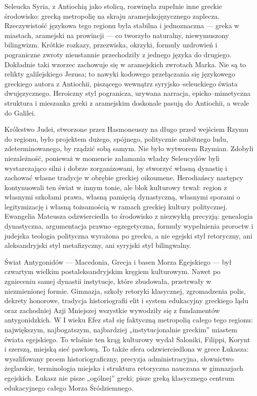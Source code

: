 Seleucka Syria, z Antiochią jako stolicą, rozwinęła zupełnie inne greckie środowisko: grecką metropolię na skraju aramejskojęzycznego zaplecza.
Rzeczywistość językowa tego regionu była stabilna i jednoznaczna — greka w miastach, aramejski na prowincji — co tworzyło naturalny, niewymuszony bilingwizm.
Krótkie rozkazy, przezwiska, okrzyki, formuły uzdrowień i pograniczne zwroty nieustannie przechodziły z jednego języka do drugiego.
Dokładnie taki wzorzec zachowuje się w aramejskich zwrotach Marka.
Nie są to relikty galilejskiego Jezusa; to nawyki kodowego przełączania się językowego greckiego autora z Antiochii, piszącego wewnątrz syryjsko–seleuckiego świata dwujęzycznego.
Heroiczny styl pogranicza, urywana narracja, epicko–mimetyczna struktura i mieszanka greki z aramejskim doskonale pasują do Antiochii, a wcale do Galilei.

Królestwo Judei, stworzone przez Hasmoneuszy na długo przed wejściem Rzymu do regionu, było projektem dużego, spójnego, politycznie ambitnego ludu, zdeterminowanego, by rządzić sobą samym.
Nie było wytworem Rzymian.
Zdobyli niezależność, ponieważ w momencie załamania władzy Seleucydów byli wystarczająco silni i dobrze zorganizowani, by stworzyć własną dynastię i zachować własne tradycje w obrębie greckiej oikoumene.
Herodiańscy następcy kontynuowali ten świat w innym tonie, ale blok kulturowy trwał: region z własnymi szkołami prawa, własną pamięcią dynastyczną, własnymi sporami o legitymizację i własną tożsamością w ramach greckiej kultury politycznej.
Ewangelia Mateusza odzwierciedla to środowisko z niezwykłą precyzją: genealogia dynastyczna, argumentacja prawno–egzegetyczna, formuły wypełnienia proroctw i judejska teologia polityczna wyrażona po grecku, a nie egejski styl retoryczny, ani aleksandryjski styl metafizyczny, ani syryjski styl bilingwalny.

Świat Antygonidów — Macedonia, Grecja i basen Morza Egejskiego — był czwartym wielkim postaleksandryjskim kręgiem kulturowym.
Nawet po zgnieceniu samej dynastii instytucje, które zbudowała, przetrwały w niezmienionej formie.
Gimnazja, szkoły retoryki klasycznej, zgromadzenia polis, dekrety honorowe, tradycja historiografii elit i system edukacyjny greckiego lądu oraz zachodniej Azji Mniejszej wszystkie wywodziły się z fundamentów antygonidzkich.
W I wieku Efez stał się faktyczną metropolią całego tego regionu: największym, najbogatszym, najbardziej „instytucjonalnie greckim” miastem świata egejskiego.
To właśnie ten krąg kulturowy wydał Saloniki, Filippi, Korynt i szerszą, miejską sieć pawłową.
To także sfera odzwierciedlona w grece Łukasza: wyszlifowany proem historiograficzny, precyzja administracyjna, słownictwo żeglarskie, terminologia miejska i struktura retoryczna nauczana w gimnazjach egejskich.
Łukasz nie pisze „ogólnej” greki; pisze greką klasycznego centrum edukacyjnego całego Morza Śródziemnego.

